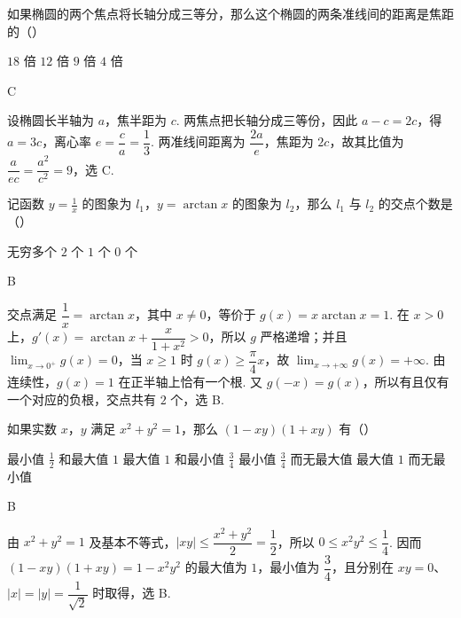 \begin{problem}
如果椭圆的两个焦点将长轴分成三等分，那么这个椭圆的两条准线间的距离是焦距的（\quad）

\choices
    {\(18\) 倍}
    {\(12\) 倍}
    {\(9\) 倍}
    {\(4\) 倍}
\end{problem}

\begin{answer}
C
\end{answer}

\begin{solution}
设椭圆长半轴为 \(a\)，焦半距为 \(c\). 两焦点把长轴分成三等份，因此 \(a-c=2c\)，得 \(a=3c\)，离心率 \(e=\dfrac ca=\dfrac13\). 两准线间距离为 \(\dfrac{2a}{e}\)，焦距为 \(2c\)，故其比值为 \(\dfrac{a}{ec}=\dfrac{a^2}{c^2}=9\)，选 C.
\end{solution}

\begin{problem}
记函数 \(y = \frac{1}{x}\) 的图象为 \(l_1\)，\(y = \arctan x\) 的图象为 \(l_2\)，那么 \(l_1\) 与 \(l_2\) 的交点个数是（\quad）

\choices
    {无穷多个}
    {\(2\) 个}
    {\(1\) 个}
    {\(0\) 个}
\end{problem}

\begin{answer}
B
\end{answer}

\begin{solution}
交点满足 \(\dfrac1x=\arctan x\)，其中 \(x\ne0\)，等价于 \(g(x)=x\arctan x=1\). 在 \(x>0\) 上，\(g'(x)=\arctan x+\dfrac{x}{1+x^2}>0\)，所以 \(g\) 严格递增；并且 \(\lim_{x\to0^+}g(x)=0\)，当 \(x\geqslant1\) 时 \(g(x)\geqslant\dfrac\pi4x\)，故 \(\lim_{x\to+\infty}g(x)=+\infty\). 由连续性，\(g(x)=1\) 在正半轴上恰有一个根. 又 \(g(-x)=g(x)\)，所以有且仅有一个对应的负根，交点共有 \(2\) 个，选 B.
\end{solution}

\begin{problem}
如果实数 \(x\)，\(y\) 满足 \(x^2 + y^2 = 1\)，那么 \((1 - xy)(1 + xy)\) 有（\quad）

\choices
    {最小值 \(\frac{1}{2}\) 和最大值 \(1\)}
    {最大值 \(1\) 和最小值 \(\frac{3}{4}\)}
    {最小值 \(\frac{3}{4}\) 而无最大值}
    {最大值 \(1\) 而无最小值}
\end{problem}

\begin{answer}
B
\end{answer}

\begin{solution}
由 \(x^2+y^2=1\) 及基本不等式，\(|xy|\leqslant\dfrac{x^2+y^2}{2}=\dfrac12\)，所以 \(0\leqslant x^2y^2\leqslant\dfrac14\). 因而
\((1-xy)(1+xy)=1-x^2y^2\) 的最大值为 \(1\)，最小值为 \(\dfrac34\)，且分别在 \(xy=0\)、\(|x|=|y|=\dfrac1{\sqrt2}\) 时取得，选 B.
\end{solution}

